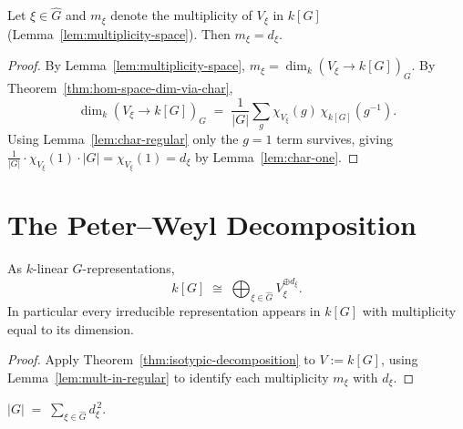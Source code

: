 \begin{lemma}[Multiplicity of $V_\xi$ in ${k[G]}$]
  \label{lem:mult-in-regular}
  Let $\xi \in \hat G$ and $m_\xi$ denote the multiplicity of $V_\xi$ in
  $k[G]$ (Lemma~\ref{lem:multiplicity-space}). Then $m_\xi = d_\xi$.
\end{lemma}

\begin{proof}
  By Lemma~\ref{lem:multiplicity-space}, $m_\xi = \dim_k(V_\xi \to k[G])_G$.
  By Theorem~\ref{thm:hom-space-dim-via-char},
  \[
    \dim_k(V_\xi \to k[G])_G \;=\; \frac{1}{|G|}\sum_g \chi_{V_\xi}(g)\,\chi_{k[G]}(g^{-1}).
  \]
  Using Lemma~\ref{lem:char-regular} only the $g = 1$ term survives, giving
  $\frac{1}{|G|} \cdot \chi_{V_\xi}(1)\cdot|G| = \chi_{V_\xi}(1) = d_\xi$
  by Lemma~\ref{lem:char-one}.
\end{proof}

\section{The Peter–Weyl Decomposition}

\begin{theorem}
  \label{thm:peter-weyl}
  As $k$-linear $G$-representations,
  \[
    k[G] \;\cong\; \bigoplus_{\xi \in \hat G} V_\xi^{\oplus d_\xi}.
  \]
  In particular every irreducible representation appears in $k[G]$ with
  multiplicity equal to its dimension.
\end{theorem}

\begin{proof}
  Apply Theorem~\ref{thm:isotypic-decomposition} to $V := k[G]$, using
  Lemma~\ref{lem:mult-in-regular} to identify each multiplicity $m_\xi$ with
  $d_\xi$.
\end{proof}

\begin{corollary}
  \label{cor:sum-of-squares}
  $\displaystyle |G| \;=\; \sum_{\xi \in \hat G} d_\xi^{\,2}$.
\end{corollary}

